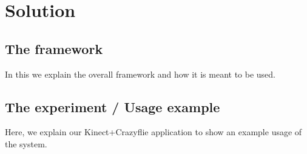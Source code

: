 \section{Solution}
\subsection{The framework}
In this we explain the overall framework and how it is meant to be used.
\subsection{The experiment / Usage example}
Here, we explain our Kinect+Crazyflie application to show an example usage of the system.